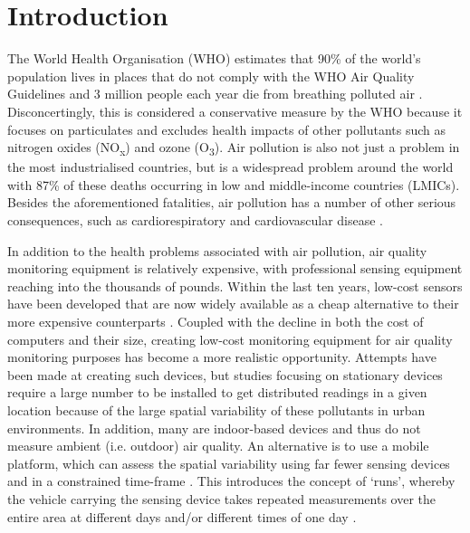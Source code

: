 \documentclass[11pt]{report}
\begin{document}
\chapter{Introduction}

The World Health Organisation (WHO) estimates that 90\% of the world's population lives in places that do not comply with the WHO Air Quality Guidelines and 3 million people each year die from breathing polluted air \citep{WHO2016ambient}. Disconcertingly, this is considered a conservative measure by the WHO because it focuses on particulates and excludes health impacts of other pollutants such as nitrogen oxides (NO\textsubscript{x}) and ozone (O\textsubscript{3}). Air pollution is also not just a problem in the most industrialised countries, but is a widespread problem around the world with 87\% of these deaths occurring in low and middle-income countries (LMICs). Besides the aforementioned fatalities, air pollution has a number of other serious consequences, such as cardiorespiratory and cardiovascular disease \citep{pope1995particulate,dockery1993_6cityairpoll,pope2002lungcancercardiomortality}.


In addition to the health problems associated with air pollution, air quality monitoring equipment is relatively expensive, with professional sensing equipment reaching into the thousands of pounds. Within the last ten years, low-cost sensors have been developed that are now widely available as a cheap alternative to their more expensive counterparts \citep{Clements2017lowcostworkshop}. Coupled with the decline in both the cost of computers and their size, creating low-cost monitoring equipment for air quality monitoring purposes has become a more realistic opportunity. Attempts have been made at creating such devices, but studies focusing on stationary devices require a large number to be installed to get distributed readings in a given location because of the large spatial variability of these pollutants in urban environments. In addition, many are indoor-based devices and thus do not measure ambient (i.e. outdoor) air quality. An alternative is to use a mobile platform, which can assess the spatial variability using far fewer sensing devices and in a constrained time-frame \citep{Hagler2010durhamallelectric,Wallace2009mobilehamilton,Westerdahl2005losangeles,Weijers2004movingmeasurementunit,Adams2012hamilton20052010,Elen2013aeroflex}. This introduces the concept of `runs', whereby the vehicle carrying the sensing device takes repeated measurements over the entire area at different days and/or different times of one day \citep{Peters2013cycleruns}.
\end{document}

